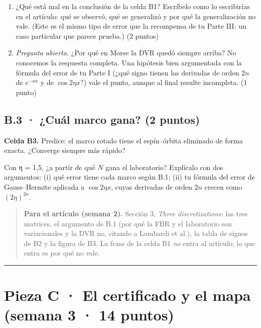 \begin{enumerate}
\def\labelenumi{(\alph{enumi})}
\item ¿Qué está mal en la conclusión de la celda B1? Escríbelo como lo escribirías en el artículo: qué se observó, qué se generalizó y por qué la generalización no vale. (Este es el mismo tipo de error que la recompensa de tu Parte III: un caso particular que parece prueba.) (2 puntos)
\item \emph{Pregunta abierta.} ¿Por qué en Morse la DVR quedó siempre arriba? No conocemos la respuesta completa. Una hipótesis bien argumentada con la fórmula del error de tu Parte I (¿qué signo tienen las derivadas de orden $2n$ de $e^{-ax}$ y de $\cos 2\eta x$?) vale el punto, aunque al final resulte incompleta. (1 punto)
\end{enumerate}


\subsection{B.3 · ¿Cuál marco gana? (2 puntos)}

\textbf{Celda B3.} Predice: el marco rotado tiene el espín--órbita eliminado de forma exacta. ¿Converge siempre más rápido? 

Con η = 1,5, ¿a partir de qué $N$ gana el laboratorio?  Explícalo con dos argumentos: (i) qué error tiene cada marco según B.1; (ii) tu fórmula del error de Gauss--Hermite aplicada a $\cos 2\eta x$, cuyas derivadas de orden $2n$ crecen como $(2\eta)^{2n}$.


\begin{quote}
\textbf{Para el artículo (semana 2).} Sección 3, \emph{Three discretizations}: las tres matrices, el argumento de B.1 (por qué la FBR y el laboratorio son variacionales y la DVR no, citando a Lombardi et al.), la tabla de signos de B2 y la figura de B3. La frase de la celda B1 \emph{no} entra al artículo; lo que entra es por qué no vale.
\end{quote}

\begin{center}\rule{0.5\linewidth}{0.5pt}\end{center}

\section{Pieza C · El certificado y el mapa (semana 3 · 14 puntos)}

